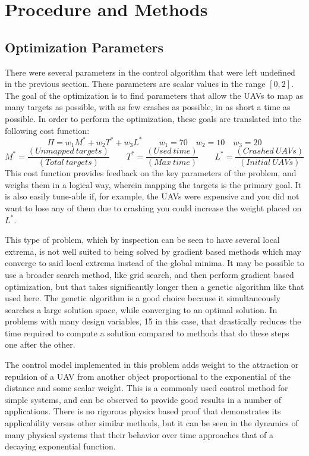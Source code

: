 \documentclass[a4paper,12pt]{report}
\begin{document}
\section{Procedure and Methods}
\subsection{Optimization Parameters}
There were several parameters in the control algorithm that were left undefined in the previous section. These parameters are scalar values in the range $[0, 2]$. The goal of the optimization is to find parameters that allow the UAVs to map as many targets as possible, with as few crashes as possible, in as short a time as possible. In order to perform the optimization, these goals are translated into the following cost function:
$$\Pi = w_1M^* + w_2T^* + w_3L^* \qquad w_1 = 70 \quad w_2 = 10 \quad w_3 = 20$$
$$ M^* = \frac{(Unmapped\ targets)}{(Total\ targets)} \qquad T^* = \frac{(Used\ time)}{(Max\ time)} \qquad L^* = \frac{(Crashed\ UAVs)}{(Initial\ UAVs)}$$
This cost function provides feedback on the key parameters of the problem, and weighs them in a logical way, wherein mapping the targets is the primary goal. It is also easily tune-able if, for example, the UAVs were expensive and you did not want to lose any of them due to crashing you could increase the weight placed on $L^*$. 

This type of problem, which by inspection can be seen to have several local extrema, is not well suited to being solved by gradient based methods which may converge to said local extrema instead of the global minima. It may be possible to use a broader search method, like grid search, and then perform gradient based optimization, but that takes significantly longer then a genetic algorithm like that used here. The genetic algorithm is a good choice because it simultaneously searches a large solution space, while converging to an optimal solution. In problems with many design variables, 15 in this case, that drastically reduces the time required to compute a solution compared to methods that do these steps one after the other.

The control model implemented in this problem adds weight to the attraction or repulsion of a UAV from another object proportional to the exponential of the distance and some scalar weight. This is a commonly used control method for simple systems, and can be observed to provide good results in a number of applications. There is no rigorous physics based proof that demonstrates its applicability versus other similar methods, but it can be seen in the dynamics of many physical systems that their behavior over time approaches that of a decaying exponential function.
\end{document}
